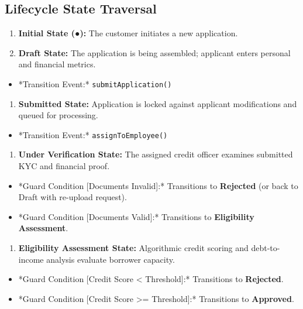 \documentclass[12pt,a4paper,oneside]{report}
\begin{document}
\subsection{Lifecycle State Traversal}

\begin{enumerate}
  \item \textbf{Initial State (●):} The customer initiates a new application.
  \item \textbf{Draft State:} The application is being assembled; applicant enters personal and financial metrics.
\end{enumerate}

\begin{itemize}
  \item *Transition Event:* \texttt{submitApplication()}
\end{itemize}

\begin{enumerate}
  \item \textbf{Submitted State:} Application is locked against applicant modifications and queued for processing.
\end{enumerate}

\begin{itemize}
  \item *Transition Event:* \texttt{assignToEmployee()}
\end{itemize}

\begin{enumerate}
  \item \textbf{Under Verification State:} The assigned credit officer examines submitted KYC and financial proof.
\end{enumerate}

\begin{itemize}
  \item *Guard Condition [Documents Invalid]:* Transitions to \textbf{Rejected} (or back to Draft with re-upload request).
  \item *Guard Condition [Documents Valid]:* Transitions to \textbf{Eligibility Assessment}.
\end{itemize}

\begin{enumerate}
  \item \textbf{Eligibility Assessment State:} Algorithmic credit scoring and debt-to-income analysis evaluate borrower capacity.
\end{enumerate}

\begin{itemize}
  \item *Guard Condition [Credit Score < Threshold]:* Transitions to \textbf{Rejected}.
  \item *Guard Condition [Credit Score >= Threshold]:* Transitions to \textbf{Approved}.
\end{itemize}
\end{document}
